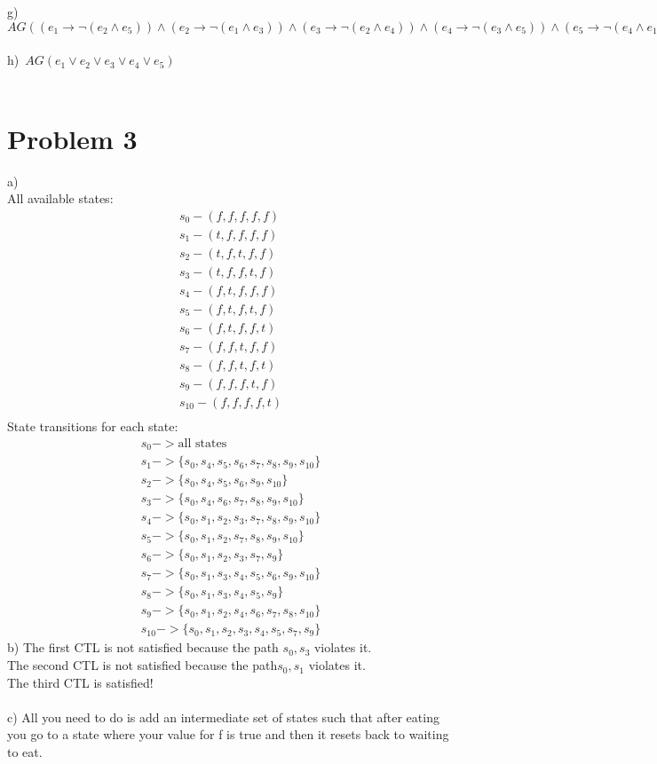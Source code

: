 \documentclass{article}
\begin{document}
g)\ $AG ((e_1 \to \neg (e_2 \land e_5)) \land  (e_2 \to \neg (e_1 \land e_3)) \land  (e_3 \to \neg (e_2 \land e_4)) \land  (e_4 \to \neg (e_3 \land e_5)) \land  (e_5 \to \neg (e_4 \land e_1))) $
\\ \\

h)\ $AG (e_1 \lor e_2 \lor e_3 \lor e_4 \lor e_5)$
\\ \\

\section{Problem 3}
a)\\
All available states:
\begin{align*}
	s_0 - (f,f,f,f,f)\\
	s_1 - (t,f,f,f,f)\\
	s_2 - (t,f,t,f,f)\\
	s_3 - (t,f,f,t,f)\\
	s_4 - (f,t,f,f,f)\\
	s_5 - (f,t,f,t,f)\\
	s_6 - (f,t,f,f,t)\\
	s_7 - (f,f,t,f,f)\\
	s_8 - (f,f,t,f,t)\\
	s_9 - (f,f,f,t,f)\\
	s_{10} - (f,f,f,f,t)\\
\end{align*}
State transitions for each state:
\begin{align*}
	s_0 -> \text{all states}\\
	s_1 -> \{s_0, s_4, s_5, s_6, s_7, s_8, s_9, s_{10}\}\\
	s_2 -> \{s_0, s_4, s_5, s_6, s_9, s_{10}\}\\
	s_3 -> \{s_0, s_4, s_6, s_7, s_8, s_9, s_{10}\}\\
	s_4 -> \{s_0, s_1, s_2, s_3, s_7, s_8, s_9, s_{10}\}\\
	s_5 -> \{s_0, s_1, s_2, s_7, s_8, s_9, s_{10}\}\\
	s_6 -> \{s_0, s_1, s_2, s_3, s_7, s_9\}\\
	s_7 -> \{s_0, s_1, s_3, s_4, s_5, s_6, s_9, s_{10}\}\\
	s_8 -> \{s_0, s_1, s_3, s_4, s_5, s_9\}\\
	s_9 -> \{s_0, s_1, s_2, s_4, s_6, s_7, s_8, s_{10}\}\\
	s_{10} -> \{s_0, s_1, s_2, s_3, s_4, s_5, s_7, s_9\}
\end{align*}
b)
The first CTL is not satisfied because the path $s_0, s_3$ violates it.\\
The second CTL is not satisfied because the path$s_0, s_1$ violates it. \\
The third CTL is satisfied!
\\ \\c)
All you need to do is add an intermediate set of states such that after eating you go to a state where your value for f is true and then it resets back to waiting to eat.
\end{document}
